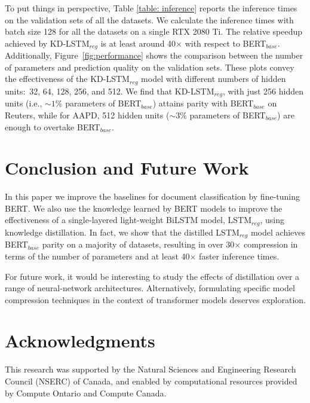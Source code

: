 \documentclass[11pt,a4paper]{article}
\newcommand{\BLSTMR}[1]{LSTM$_{reg}$}
\newcommand{\BERTB}[1]{BERT$_{base}$}
\begin{document}
To put things in perspective, Table \ref{table: inference} reports the inference times on the validation sets of all the datasets.
We calculate the inference times with batch size 128 for all the datasets on a single RTX 2080 Ti.
The relative speedup achieved by KD-\BLSTMR{} is at least around 40$\times$ with respect to \BERTB{}.
Additionally, Figure~\ref{fig:performance} shows the comparison between the number of parameters and prediction quality on the validation sets.
These plots convey the effectiveness of the KD-\BLSTMR{} model with different numbers of hidden units:\ 32, 64, 128, 256, and 512.
We find that KD-\BLSTMR{}, with just 256 hidden units (i.e., $\sim 1\%$ parameters of \BERTB{}) attains parity with \BERTB{} on Reuters, while for AAPD, 512 hidden units ($\sim 3\%$ parameters of \BERTB{}) are enough to overtake \BERTB{}.


\section{Conclusion and Future Work}

In this paper we improve the baselines for document classification by fine-tuning BERT.
We also use the knowledge learned by BERT models to improve the effectiveness of a single-layered light-weight BiLSTM model, \BLSTMR{}, using knowledge distillation.
In fact, we show that the distilled \BLSTMR{} model achieves \BERTB{} parity on a majority of datasets, resulting in over 30$\times$ compression in terms of the number of parameters and at least 40$\times$ faster inference times.

For future work, it would be interesting to study the effects of distillation over a range of neural-network architectures.
Alternatively, formulating specific model compression techniques in the context of transformer models deserves exploration.

\section*{Acknowledgments}

This research was supported by the Natural Sciences and Engineering Research Council (NSERC) of Canada, and enabled by computational resources provided by Compute Ontario and Compute Canada.




\clearpage

\appendix
\end{document}

